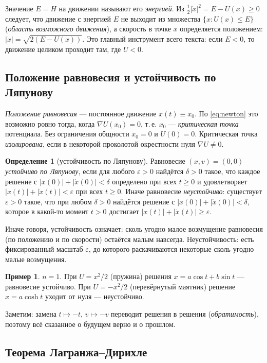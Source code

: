 \documentclass[11pt,a4paper]{article}
\theoremstyle{definition}
\newtheorem{definition}[theorem]{Определение}
\newtheorem{example}[theorem]{Пример}
\newcommand{\eps}{\varepsilon}
\newcommand{\term}[1]{\emph{#1}}
\begin{document}
Значение $E=H$ на движении называют его \term{энергией}. Из $\tfrac12|\dot x|^2=E-U(x)\ge0$
следует, что движение с энергией $E$ не выходит из множества $\{x:U(x)\le E\}$ (\term{область
возможного движения}), а скорость в точке $x$ определяется положением: $|\dot x|=\sqrt{2(E-U(x))}$.
Это главный инструмент всего текста: если $E<0$, то движение целиком проходит там, где $U<0$.

\subsection{Положение равновесия и устойчивость по Ляпунову}

\term{Положение равновесия} --- постоянное движение $x(t)\equiv x_0$. По \eqref{eq:newton} это
возможно ровно тогда, когда $\nabla U(x_0)=0$, т.\,е. $x_0$ --- \term{критическая точка}
потенциала. Без ограничения общности $x_0=0$ и $U(0)=0$. Критическая точка \term{изолирована},
если в некоторой проколотой окрестности нуля $\nabla U\ne0$.

\begin{definition}[устойчивость по Ляпунову]\label{def:stab}
Равновесие $(x,v)=(0,0)$ \term{устойчиво по Ляпунову}, если для любого $\eps>0$ найдётся
$\delta>0$ такое, что каждое решение с $|x(0)|+|\dot x(0)|<\delta$ определено при всех $t\ge0$
и удовлетворяет $|x(t)|+|\dot x(t)|<\eps$ при всех $t\ge0$. Иначе равновесие
\term{неустойчиво}: существует $\eps>0$ такое, что при любом $\delta>0$ найдётся решение с
$|x(0)|+|\dot x(0)|<\delta$, которое в какой-то момент $t>0$ достигает $|x(t)|+|\dot x(t)|\ge\eps$.
\end{definition}

Иначе говоря, устойчивость означает: сколь угодно малое возмущение равновесия (по положению и
по скорости) остаётся малым навсегда. Неустойчивость: есть фиксированный масштаб $\eps$, до
которого раскачиваются некоторые сколь угодно малые возмущения.

\begin{example}
$n=1$. При $U=x^2/2$ (пружина) решения $x=a\cos t+b\sin t$ --- равновесие устойчиво.
При $U=-x^2/2$ (перевёрнутый маятник) решение $x=a\cosh t$ уходит от нуля --- неустойчиво.
\end{example}

Заметим: замена $t\mapsto-t$, $v\mapsto-v$ переводит решения в решения (\term{обратимость}),
поэтому всё сказанное о будущем верно и о прошлом.

\subsection{Теорема Лагранжа--Дирихле}
\end{document}

